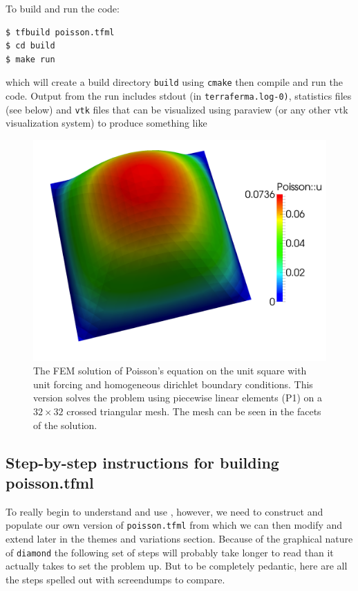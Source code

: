 To build and run the code:
\begin{lstlisting}[style=Bash]
$ tfbuild poisson.tfml
$ cd build
$ make run 
\end{lstlisting}
which will create a build directory \texttt{build} using
\texttt{cmake} then compile and run the code. Output from the run
includes stdout (in \texttt{terraferma.log-0)}, statistics files (see
below) and \texttt{vtk} files that can be visualized using paraview
(or any other vtk visualization system) to produce something like
\begin{figure}[h]
  \centering
  \includegraphics[width=.8\textwidth]{figures/poisson_simple.png}
  \caption{\protect\small The FEM solution of Poisson's equation on the unit square
    with unit forcing and homogeneous dirichlet boundary conditions.
    This version solves the problem using piecewise linear elements (P1)
    on a $32\times 32$ crossed triangular mesh. The mesh can be seen
    in the facets of the solution.}
  \label{fig:simple_poisson}
\end{figure}

\subsection{Step-by-step instructions for building poisson.tfml}
\label{sec:step-step-instr}

To really begin to understand and use \TF{}, however, we need to
construct and populate our own version of \texttt{poisson.tfml} from
which we can then modify and extend later in the themes and variations
section.  Because of the graphical nature of \texttt{diamond} the
following set of steps will probably take longer to read than it
actually takes to set the problem up.  But to be completely pedantic,
here are all the steps spelled out with screendumps to compare.

